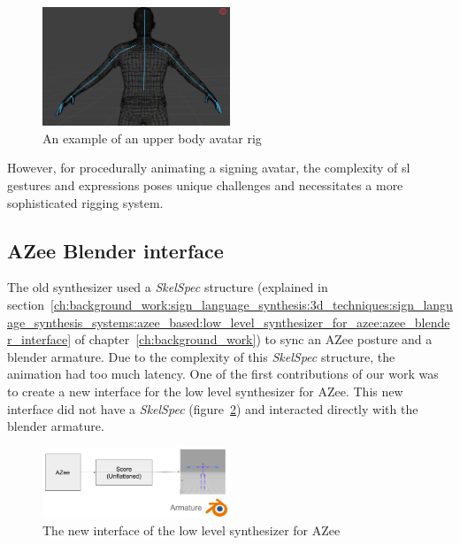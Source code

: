 \documentclass[../../main.tex]{subfiles}
\begin{document}
\begin{figure}[h]
    \centering
    \includegraphics[width=0.5\textwidth]{chapters/avatar_creation_pose_synthesis/images/upper_body_avatar.png}
    \caption{An example of an upper body avatar rig}
    \label{fig:upper_body_avatar}
\end{figure}

However, for procedurally animating a signing avatar, the complexity of \gls{sl} gestures and expressions poses unique challenges and necessitates a more sophisticated rigging system.

\subsection{AZee Blender interface}
\label{ch:avatar_creation_pose_synthesis:proc_rig_signing_avatars:azee_blender_interface}

The old synthesizer used a \emph{SkelSpec} structure (explained in section~\ref{ch:background_work:sign_language_synthesis:3d_techniques:sign_language_synthesis_systems:azee_based:low_level_synthesizer_for_azee:azee_blender_interface} of chapter~\ref{ch:background_work}) to sync an AZee posture and a blender armature. Due to the complexity of this \emph{SkelSpec} structure, the animation had too much latency. One of the first contributions of our work was to create a new interface for the low level synthesizer for AZee. This new interface did not have a \emph{SkelSpec} (figure~\ref{fig:new_interface}) and interacted directly with the blender armature. 

\begin{figure}
    \centering
    \includegraphics[width=0.5\textwidth]{chapters/avatar_creation_pose_synthesis/images/new_interface.png}
    \caption{The new interface of the low level synthesizer for AZee}
    \label{fig:new_interface}
\end{figure}
\end{document}
